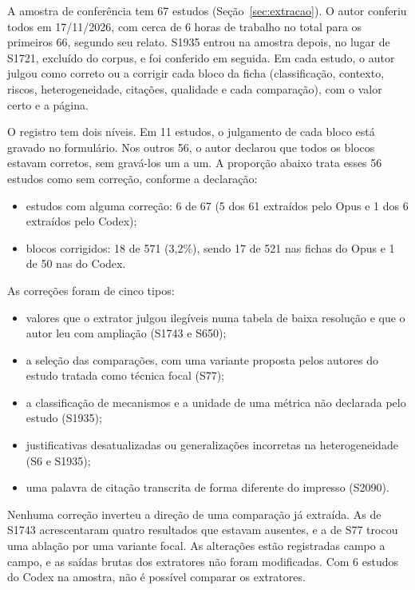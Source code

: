 A amostra de conferência tem 67 estudos (Seção~\ref{sec:extracao}). O autor conferiu todos em 17/11/2026, com
cerca de 6 horas de trabalho no total para os primeiros 66, segundo seu relato. S1935 entrou na amostra depois, no
lugar de S1721, excluído do corpus, e foi conferido em seguida. Em cada estudo, o autor julgou como correto ou a
corrigir cada bloco da ficha (classificação, contexto, riscos, heterogeneidade, citações, qualidade e cada
comparação), com o valor certo e a página.

O registro tem dois níveis. Em 11 estudos, o julgamento de cada bloco está gravado no formulário. Nos outros 56, o
autor declarou que todos os blocos estavam corretos, sem gravá-los um a um. A proporção abaixo trata esses 56
estudos como sem correção, conforme a declaração:
\begin{itemize}
  \item estudos com alguma correção: 6 de 67 (5 dos 61 extraídos pelo Opus e 1 dos 6 extraídos pelo Codex);
  \item blocos corrigidos: 18 de 571 (3,2\%), sendo 17 de 521 nas fichas do Opus e 1 de 50 nas do Codex.
\end{itemize}

As correções foram de cinco tipos:
\begin{itemize}
  \item valores que o extrator julgou ilegíveis numa tabela de baixa resolução e que o autor leu com ampliação
  (S1743 e S650);
  \item a seleção das comparações, com uma variante proposta pelos autores do estudo tratada como técnica focal (S77);
  \item a classificação de mecanismos e a unidade de uma métrica não declarada pelo estudo (S1935);
  \item justificativas desatualizadas ou generalizações incorretas na heterogeneidade (S6 e S1935);
  \item uma palavra de citação transcrita de forma diferente do impresso (S2090).
\end{itemize}
Nenhuma correção inverteu a direção de uma comparação já extraída. As de S1743 acrescentaram quatro resultados que
estavam ausentes, e a de S77 trocou uma ablação por uma variante focal. As alterações estão registradas campo a
campo, e as saídas brutas dos extratores não foram modificadas. Com 6 estudos do Codex na amostra, não é possível
comparar os extratores.

